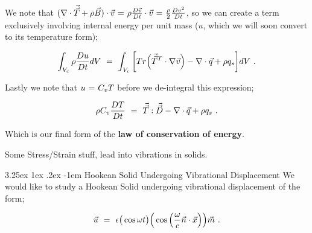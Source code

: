 \documentclass{article}
\makeatletter
\newcounter{subsubsubsection}[subsubsection]
\renewcommand\subparagraph{\@startsection{subparagraph}{6}{\parindent}%
  {3.25ex \@plus1ex \@minus .2ex}%
  {-1em}%
  {\normalfont\normalsize\bfseries}}
\makeatother
\begin{document}
We note that \begin{math} ( \nabla \cdot \vec{\vec{T}} + \rho \vec{B} ) \cdot \vec{v} \hspace{0.025cm} = \hspace{0.025cm} \rho \frac{D \vec{v}}{D t} \cdot \vec{v} \hspace{0.025cm} = \hspace{0.025cm} \frac{\rho}{2} \frac{D v^2}{D t} \end{math}, so we can create a term exclusively involving internal energy per unit mass (\begin{math} u \end{math}, which we will soon convert to its temperature form); 

\begin{equation} \label{eb-eq-1-141}
\int_{V_c} \rho \frac{D u}{D t} dV \hspace{0.125cm} = \hspace{0.125cm} \int_{V_c} \bigg[ Tr \Big( \vec{\vec{T}}^T \cdot \nabla{\vec{v}} \Big) - \nabla \cdot \vec{q} + \rho q_s \bigg] dV  \hspace{0.125cm}  . 
\end{equation}

Lastly we note that \begin{math} u \hspace{0.025cm} = \hspace{0.025cm} C_v T \end{math} before we de-integral this expression;

\begin{equation} \label{eb-eq-1-142}
 \rho C_v \frac{D T}{D t}\hspace{0.125cm} = \hspace{0.125cm} \vec{\vec{T}} : \vec{\vec{D}} - \nabla \cdot \vec{q} + \rho q_s \hspace{0.125cm}  . 
\end{equation}

Which is our final form of the \textbf{law of conservation of energy}. 

\vspace{5cm}

Some Stress/Strain stuff, lead into vibrations in solids. 

\subparagraph{Hookean Solid Undergoing Vibrational Displacement}
We would like to study a Hookean Solid undergoing vibrational displacement of the form;

\begin{equation} \label{eb-eq-1-143}
\vec{u} \hspace{0.125cm} = \hspace{0.125cm} \epsilon \big( \cos{ \omega t } \big) \Big( \cos \Big( \frac{\omega}{c} \vec{n} \cdot \vec{x} \Big) \Big) \vec{m} \hspace{0.125cm}  . 
\end{equation} 
\end{document}
